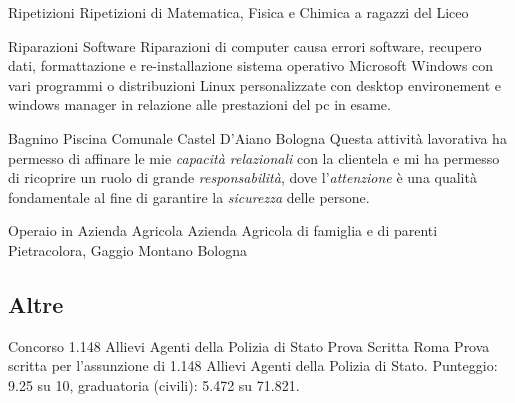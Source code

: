 {Ripetizioni}
{}
{}
{}
{Ripetizioni di Matematica, Fisica e Chimica a ragazzi del Liceo}

{Riparazioni Software}
{}
{}
{}
{Riparazioni di computer causa errori software, recupero dati, formattazione e
re-installazione sistema operativo Microsoft Windows con vari programmi o
distribuzioni Linux personalizzate con desktop environement e windows manager in
relazione alle prestazioni del pc in esame.}

{Bagnino}
{Piscina Comunale}
{Castel D'Aiano}
{Bologna}
{Questa attività lavorativa ha permesso di affinare le mie \textit{capacità
relazionali} con la clientela e mi ha permesso di ricoprire un ruolo di grande
\textit{responsabilità}, dove l'\textit{attenzione} è una qualità fondamentale
al fine di garantire la \textit{sicurezza} delle persone.}

{Operaio in Azienda Agricola}
{Azienda Agricola di famiglia e di parenti}
{Pietracolora, Gaggio Montano}
{Bologna}
{}



\subsection{Altre}

{Concorso 1.148 Allievi Agenti della Polizia di Stato}
{Prova Scritta}
{Roma}
{}
{Prova scritta per l'assunzione di 1.148 Allievi Agenti della Polizia di
Stato.\newline
Punteggio: 9.25 su 10, graduatoria (civili): 5.472 su 71.821.}
